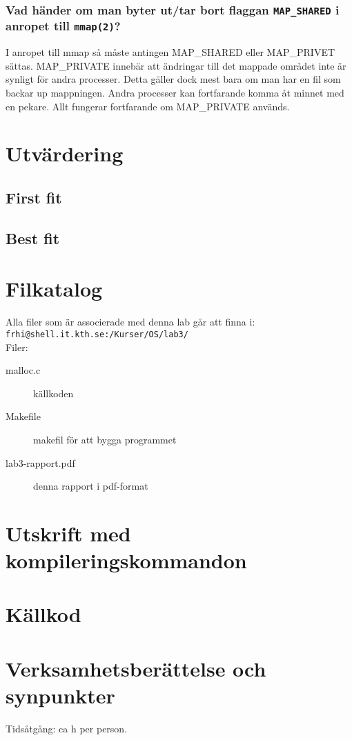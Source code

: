 \documentclass[a4paper]{article}
\begin{document}
\subsubsection*{Vad händer om man byter ut/tar bort flaggan \texttt{MAP\_SHARED} i anropet till \texttt{mmap(2)}?} %
I anropet till mmap så måste antingen MAP_SHARED eller MAP_PRIVET sättas. MAP_PRIVATE innebär att ändringar till det mappade området inte är synligt för andra processer. Detta gäller dock mest bara om man har en fil som backar up mappningen. Andra processer kan fortfarande komma åt minnet med en pekare. Allt fungerar fortfarande om MAP_PRIVATE används.

\section*{Utvärdering}


\subsection*{First fit}

\subsection*{Best fit}

\section*{Filkatalog}
Alla filer som är associerade med denna lab går att finna i:\\
\texttt{frhi@shell.it.kth.se:/Kurser/OS/lab3/}
\\
Filer:
\begin{description}
\item[malloc.c] källkoden
\item[Makefile] makefil för att bygga programmet
\item[lab3-rapport.pdf] denna rapport i pdf-format
\end{description}

\section*{Utskrift med kompileringskommandon}
%

\section*{Källkod}
%

\section*{Verksamhetsberättelse och synpunkter}
Tidsåtgång: ca h per person.
\end{document}
